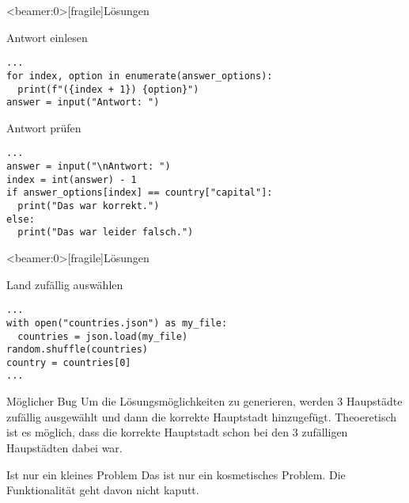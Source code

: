 \begin{frame}<beamer:0>[fragile]{Lösungen}
	
\begin{solutionblock}{Antwort einlesen}
\begin{verbatim}
...
for index, option in enumerate(answer_options):
  print(f"({index + 1}) {option}")
answer = input("Antwort: ")
\end{verbatim}
\end{solutionblock}

\vspace{12pt}

\begin{solutionblock}{Antwort prüfen}
\begin{verbatim}
...
answer = input("\nAntwort: ")
index = int(answer) - 1
if answer_options[index] == country["capital"]:
  print("Das war korrekt.")
else:
  print("Das war leider falsch.")
\end{verbatim}
\end{solutionblock}


\end{frame}

\begin{frame}<beamer:0>[fragile]{Lösungen}
	
\begin{solutionblock}{Land zufällig auswählen}
\begin{verbatim}
...
with open("countries.json") as my_file:
  countries = json.load(my_file)
random.shuffle(countries)
country = countries[0]
...
\end{verbatim}
\end{solutionblock}
\end{frame}


\begin{frame}
\begin{alertblock}{Möglicher Bug}
\vspace{2pt}
Um die Lösungsmöglichkeiten zu generieren, werden 3 Haupstädte zufällig ausgewählt und dann die korrekte Hauptstadt hinzugefügt. 
Theoeretisch ist es möglich, dass die korrekte Hauptstadt schon bei den 3 zufälligen Haupstädten dabei war. 
\end{alertblock}
\pause
\vspace{12pt} 
\begin{exampleblock}{Ist nur ein kleines Problem}
\vspace{2pt}
Das ist nur ein kosmetisches Problem. Die Funktionalität geht davon nicht kaputt. 
\end{exampleblock}
\end{frame}


